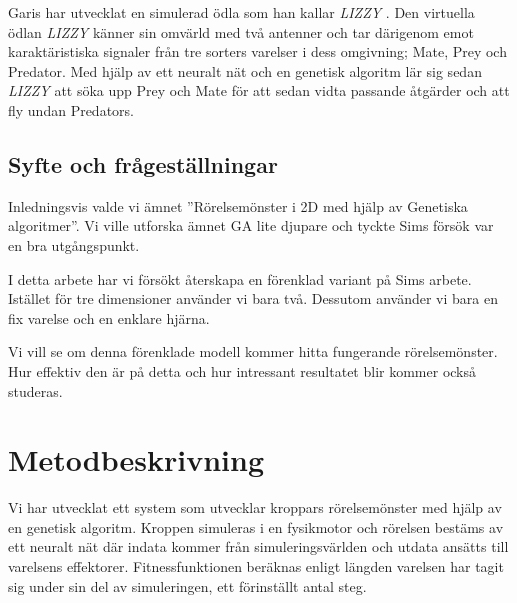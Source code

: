 \documentclass[titlepage, twocolumn, a4paper, 11pt, swedish]{article}
\begin{document}
Garis har utvecklat en simulerad ödla som han kallar \textit{LIZZY} \cite{garis}. Den virtuella ödlan \textit{LIZZY} känner sin omvärld med två antenner och tar därigenom emot karaktäristiska signaler från tre sorters varelser i dess omgivning; Mate, Prey och Predator. Med hjälp av ett neuralt nät och en genetisk algoritm lär sig sedan \textit{LIZZY} att söka upp Prey och Mate för att sedan vidta passande åtgärder och att fly undan Predators.

\subsection{Syfte och frågeställningar}
Inledningsvis valde vi ämnet ''Rörelse\-mönster i 2D med hjälp av Genetiska algoritmer''. Vi ville utforska ämnet GA lite djupare och tyckte Sims försök var en bra utgångspunkt. 

I detta arbete har vi försökt återskapa en förenklad variant på Sims arbete. Istället för tre dimensioner använder vi bara två. Dessutom använder vi bara en fix varelse och en enklare hjärna. 

Vi vill se om denna förenklade modell kommer hitta fungerande rörelsemönster. Hur effektiv den är på detta och hur intressant resultatet blir kommer också studeras. 






\section{Metodbeskrivning}
Vi har utvecklat ett system som utvecklar kroppars rörelsemönster med hjälp av en genetisk algoritm. Kroppen simuleras i en fysikmotor och rörelsen bestäms av ett neuralt nät där indata kommer från simuleringsvärlden och utdata ansätts till varelsens effektorer. Fitnessfunktionen beräknas enligt längden varelsen har tagit sig under sin del av simuleringen, ett förinställt antal steg.
\end{document}
